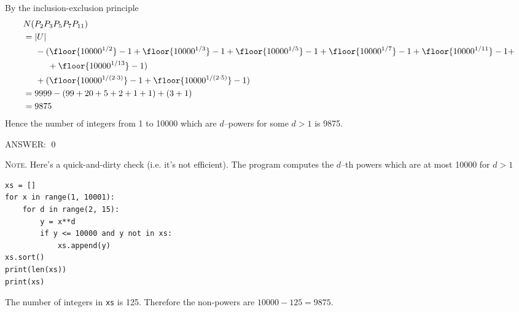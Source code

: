 By the inclusion-exclusion principle
\begin{align*}
&N(P_2 P_3 P_5 P_7 P_{11}) \\
&= |U|  \\
&\hspace{0.5cm} - (\floor{10000^{1/2}} - 1 +
                   \floor{10000^{1/3}} - 1 + 
                   \floor{10000^{1/5}} - 1 + 
                   \floor{10000^{1/7}} - 1 + 
                   \floor{10000^{1/11}} - 1 + \\
&\hspace{1cm}      + \floor{10000^{1/13}} - 1
                  ) \\
&\hspace{0.5cm} + (\floor{10000^{1/(2\cdot 3)}} - 1 +
                   \floor{10000^{1/(2\cdot 5)}} - 1
                  ) \\
&= 9999 - (99 + 20 + 5 + 2 + 1 + 1) + (3 + 1)\\
&= 9875
\end{align*}
Hence the number of integers from 1 to 10000 which are $d$--powers
for some $d > 1$ is 9875.

ANSWER:
\qed


\vspace{1cm}

\textsc{Note.}
Here's a quick-and-dirty check (i.e. it's not efficient).
The program computes the $d$--th powers which are at most 10000
for $d > 1$ 
\begin{Verbatim}[frame=single,fontsize=\footnotesize]
xs = []
for x in range(1, 10001):
    for d in range(2, 15):
        y = x**d
        if y <= 10000 and y not in xs:
            xs.append(y)
xs.sort()
print(len(xs))
print(xs)
\end{Verbatim}
The number of integers in \verb!xs! is 125.
Therefore the non-powers are $10000 - 125 = 9875$.
